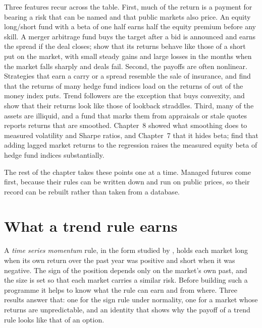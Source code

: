\begin{chapterrefs}
Three features recur across the table. First, much of the return is a payment for bearing a risk that
can be named and that public markets also price. An equity long/short fund with a beta of one half
earns half the equity premium before any skill. A merger arbitrage fund buys the target after a bid
is announced and earns the spread if the deal closes; \textcite{mitchell2001} show that its returns
behave like those of a short put on the market, with small steady gains and large losses in the months
when the market falls sharply and deals fail. Second, the payoffs are often nonlinear. Strategies that
earn a carry or a spread resemble the sale of insurance, and \textcite{agarwal2004} find that the
returns of many hedge fund indices load on the returns of out of the money index puts. Trend
followers are the exception that buys convexity, and \textcite{fung2001} show that their returns look
like those of lookback straddles. Third, many of the assets are illiquid, and a fund that marks them
from appraisals or stale quotes reports returns that are smoothed. Chapter~8 showed what smoothing
does to measured volatility and Sharpe ratios, and Chapter~7 that it hides beta; \textcite{asness2001}
find that adding lagged market returns to the regression raises the measured equity beta of hedge
fund indices substantially.

The rest of the chapter takes these points one at a time. Managed futures come first, because their
rules can be written down and run on public prices, so their record can be rebuilt rather than taken
from a database.

\FloatBarrier
\section{What a trend rule earns}
\label{sec9:theory}

A \emph{time series momentum} rule, in the form studied by \textcite{moskowitz2012}, holds each market
long when its own return over the past year was positive and short when it was negative. The sign of
the position depends only on the market's own past, and the size is set so that each market carries a
similar risk. Before building such a programme it helps to know what the rule can earn and from where.
Three results answer that: one for the sign rule under normality, one for a market whose returns are
unpredictable, and an identity that shows why the payoff of a trend rule looks like that of an option.


\end{chapterrefs}
